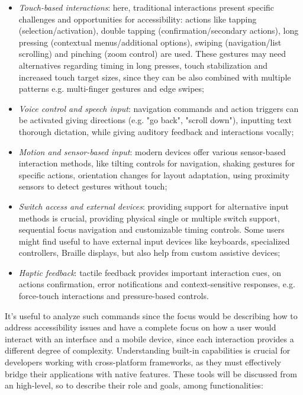 \begin{itemize}
    \item \textit{Touch-based interactions}: here, traditional interactions present specific challenges and opportunities for accessibility: actions like tapping (selection/activation), double tapping (confirmation/secondary actions), long pressing (contextual menus/additional options), swiping (navigation/list scrolling) and pinching (zoom control) are used. These gestures may need alternatives regarding timing in long presses, touch stabilization and increased touch target sizes, since they can be also combined with multiple patterns e.g. multi-finger gestures and edge swipes;
    \item \textit{Voice control and speech input}: navigation commands and action triggers can be activated giving directions (e.g. "go back", "scroll down"), inputting text thorough dictation, while giving auditory feedback and interactions vocally;
    \item \textit{Motion and sensor-based input}: modern devices offer various sensor-based interaction methods, like tilting controls for navigation, shaking gestures for specific actions, orientation changes for layout adaptation, using proximity sensors to detect gestures without touch;
    \item \textit{Switch access and external devices}: providing support for alternative input methods is crucial, providing physical single or multiple switch support, sequential focus navigation and customizable timing controls. Some users might find useful to have external input devices like keyboards, specialized controllers, Braille displays, but also help from custom assistive devices;
    \item \textit{Haptic feedback}: tactile feedback provides important interaction cues, on actions confirmation, error notifications and context-sensitive responses, e.g. force-touch interactions and pressure-based controls.
\end{itemize}

It's useful to analyze such commands since the focus would be describing how to address accessibility issues and have a complete focus on how a user would interact with an interface and a mobile device, since each interaction provides a different degree of complexity. Understanding built-in capabilities is crucial for developers working with cross-platform frameworks, as they must effectively bridge their applications with native features. These tools will be discussed from an high-level, so to describe their role and goals, among functionalities:

